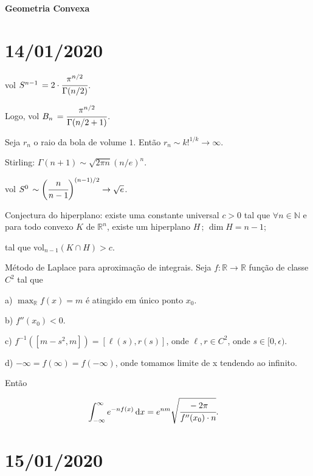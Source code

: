 \documentclass[12pt]{article}
\begin{document}
\Large

\begin{center}
\textbf{Geometria Convexa}
\end{center}

\large

\section{14/01/2020}

\begin{flushright}
\end{flushright}

vol $S^{n-1}\,= 2\cdot \cfrac{\pi^{n/2}}{\Gamma(n/2)}$.

Logo, vol $B_n\,= \cfrac{\pi^{n/2}}{\Gamma(n/2 + 1)}$.

Seja $r_n$ o raio da bola de volume $1$. Ent\~ao $r_n \sim k!^{1/k} \to \infty$.

Stirling: $\Gamma(n+1) \sim \sqrt{2\pi n} (n/e)^n$.

vol $S^0\,\sim \bigg( \cfrac{n}{n-1} \bigg)^{(n-1)/2} \to \sqrt{e}$.

Conjectura do hiperplano: existe uma constante universal $c > 0$ tal que $\forall n \in \mathbb{N}$ e para todo convexo $K$ de $\mathbb{R}^n$, existe um hiperplano $H\,;\,\dim H = n - 1$;

tal que vol$_{n - 1} (K \cap H) > c$.

M\'etodo de Laplace para aproxima\c{c}\~ao de integrais. Seja $f : \mathbb{R} \to \mathbb{R}$ fun\c{c}\~ao de classe $C^2$ tal que

a) $\max_{\mathbb{R}} f(x) = m$ \'e atingido em \'unico ponto $x_0$.

b) $f''(x_0) < 0$.

c) $f^{-1} ( [ m - s^2, m]) = [\ell(s), r(s)]$, onde $\ell, r \in C^2$, onde $s \in [0, \epsilon)$.

d) $- \infty = f(\infty) = f(-\infty)$, onde tomamos limite de x tendendo ao infinito.

Ent\~ao

\begin{align}
\int_{-\infty}^{\infty} e^{-nf(x)}\,\mathrm{d}x &= e^{nm} \sqrt{\cfrac{-2\pi}{f''(x_0)\cdot n}}.
\end{align}

\vspace{100mm}

\section{15/01/2020}
\end{document}
